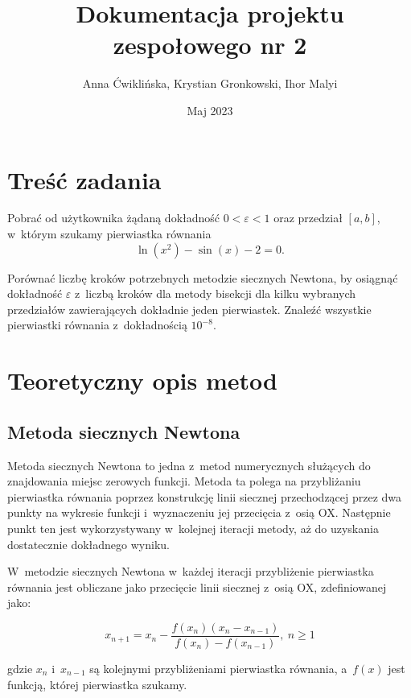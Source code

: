 \documentclass[12pt]{article}
\title{Dokumentacja projektu zespołowego nr 2}
\author{Anna Ćwiklińska, Krystian Gronkowski, Ihor Malyi}
\date{Maj 2023}
\begin{document}
\lstset{basicstyle=\ttfamily, columns=fullflexible, upquote=true}
\renewcommand{\lstlistingname}{Listing}

\maketitle
\newpage
{\hypersetup{hidelinks}
\tableofcontents
}
\newpage
\section{Treść zadania}
Pobrać od użytkownika żądaną dokładność $0<\varepsilon<1$ oraz przedział $[a,b]$, w~którym szukamy pierwiastka równania $$\ln(x^2) - \sin(x) - 2 = 0.$$

Porównać liczbę kroków potrzebnych metodzie siecznych Newtona, by osiągnąć dokładność $\varepsilon$ z~liczbą kroków dla metody bisekcji dla kilku wybranych przedziałów zawierających dokładnie jeden pierwiastek. Znaleźć wszystkie pierwiastki równania z~dokładnością $10^{-8}$.

\section{Teoretyczny opis metod}
\subsection{Metoda siecznych Newtona}
Metoda siecznych Newtona to jedna z~metod numerycznych służących do znajdowania miejsc zerowych funkcji. Metoda ta polega na przybliżaniu pierwiastka równania poprzez konstrukcję linii siecznej przechodzącej przez dwa punkty na wykresie funkcji i~wyznaczeniu jej przecięcia z~osią OX. Następnie punkt ten jest wykorzystywany w~kolejnej iteracji metody, aż do uzyskania dostatecznie dokładnego wyniku.

W~metodzie siecznych Newtona w~każdej iteracji przybliżenie pierwiastka równania jest obliczane jako przecięcie linii siecznej z~osią OX, zdefiniowanej jako:

$$x_{n+1} = x_n - \frac{f(x_n)(x_n-x_{n-1})}{f(x_n)-f(x_{n-1})},\ n\geq1$$

gdzie $x_n$ i~$x_{n-1}$ są kolejnymi przybliżeniami pierwiastka równania, a~$f(x)$ jest funkcją, której pierwiastka szukamy.
\end{document}
